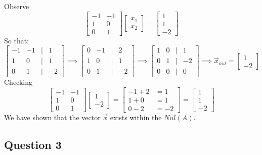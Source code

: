 \documentclass[11pt]{article}
\theoremstyle{plain}
\begin{document}
Observe
\[
	\begin{bmatrix}
		-1 & -1 \\
		1  & 0  \\
		0  & 1
	\end{bmatrix}
	\begin{bmatrix}
		x_1 \\
		x_2
	\end{bmatrix}
	=
	\begin{bmatrix}
		1 \\
		1 \\
		-2
	\end{bmatrix}
\]
So that:
\[
	\begin{bmatrix}
		-1 & -1 & | & 1  \\
		1  & 0  & | & 1  \\
		0  & 1  & | & -2
	\end{bmatrix} \implies
	\begin{bmatrix}
		0 & -1 & | & 2  \\
		1 & 0  & | & 1  \\
		0 & 1  & | & -2
	\end{bmatrix} \implies
	\begin{bmatrix}
		1 & 0 & | & 1  \\
		0 & 1 & | & -2 \\
		0 & 0 & | & 0
	\end{bmatrix} \implies \vec{x}_{nul} =
	\begin{bmatrix}
		1 \\
		-2
	\end{bmatrix}
\]
Checking
\[
	\begin{bmatrix}
		-1 & -1 \\
		1  & 0  \\
		0  & 1
	\end{bmatrix}
	\begin{bmatrix}
		1 \\
		-2
	\end{bmatrix}
	=
	\begin{bmatrix}
		-1 + 2 & = 1  \\
		1 + 0  & = 1  \\
		0 - 2  & = -2
	\end{bmatrix}
	=
	\begin{bmatrix}
		1 \\
		1 \\
		-2
	\end{bmatrix}
\]
We have shown that the vector $\vec{x}$ exists within the $Nul(A)$.
\begin{center}
	\section*{Question 3}
\end{center}
\end{document}
